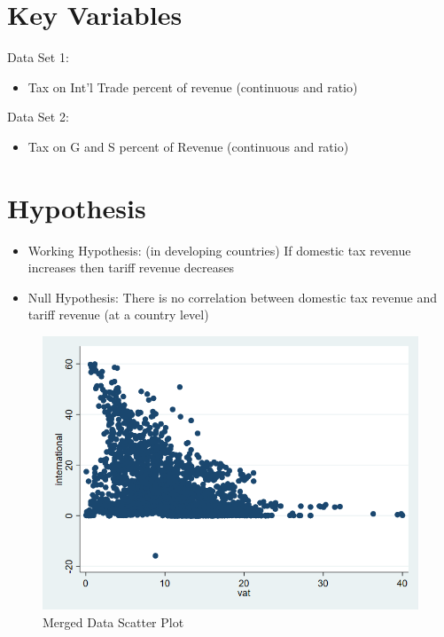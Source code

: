\documentclass[12pt]{article}
\begin{document}
\section{Key Variables}
\label{sec:result}



Data Set 1: 
\begin{itemize}
 \item Tax on Int'l Trade percent of revenue (continuous and ratio)
\end{itemize}
Data Set 2: 
\begin{itemize}
    \item Tax on G and S percent of Revenue (continuous and ratio)
\end{itemize}
\section{Hypothesis}
\begin{itemize}
    \item Working Hypothesis: (in developing countries) If domestic tax revenue increases then tariff revenue decreases
    \item Null Hypothesis: There is no correlation between domestic tax revenue and tariff revenue (at a country level)
\end{itemize}


\begin{figure}
    \centering
    \includegraphics[width=0.5\linewidth]{mergedscatter.png}
    \caption{Merged Data Scatter Plot}
    \label{fig:enter-label}
\end{figure}
\end{document}
